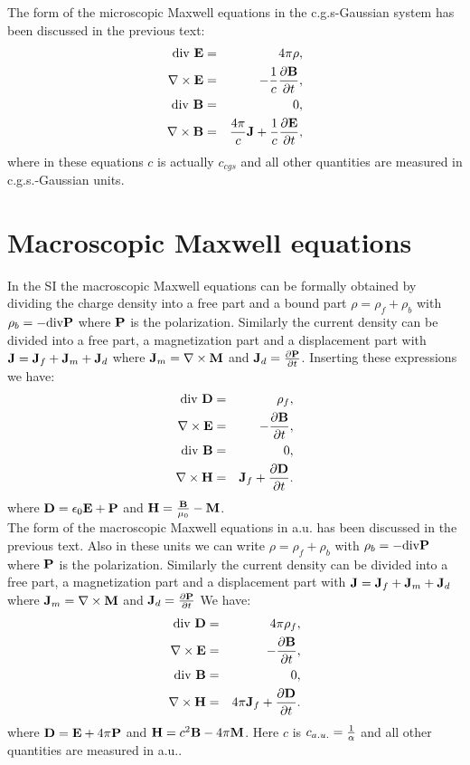 \documentclass[12pt,a4paper]{article}
\begin{document}
{\color{orange} The form of the microscopic Maxwell equations
in the c.g.s-Gaussian system has been discussed in the previous text:
\begin{eqnarray}
{\rm div}\ {\bf E} &=& 4 \pi \rho, \\
\nabla \times {\bf E} &=& -{1\over c} {\partial {\bf B} \over \partial t}, \\
{\rm div}\  {\bf B} &=& 0, \\
\nabla \times {\bf B} &=& {4 \pi \over c} {\bf J}+ {1\over c}
{\partial {\bf E} \over \partial t}, 
\end{eqnarray}
where in these equations $c$ is actually $c_{cgs}$ and all 
other quantities are measured in c.g.s.-Gaussian units.
}

\newpage
\section{\color{coral}Macroscopic Maxwell equations}
In the SI the macroscopic Maxwell equations can be formally
obtained by dividing the charge density into a free part and a
bound part $\rho=\rho_f+\rho_b$ with $\rho_b=-{\rm div} {\bf P}$
where ${\bf P}$ is the polarization.
Similarly the current density can be divided into a free part, a 
magnetization part 
and a displacement part with ${\bf J}={\bf J}_f + {\bf J}_m + {\bf J}_d$ where
${\bf J}_m=\nabla \times {\bf M}$ and ${\bf J}_d={\partial {\bf P}\over 
\partial t}$.
Inserting these expressions we have:
\begin{eqnarray}
{\rm div}\ {\bf D} &=& \rho_f, \\
\nabla \times {\bf E} &=& -{\partial {\bf B} \over \partial t}, \\
{\rm div}\  {\bf B} &=& 0, \\
\nabla \times {\bf H} &=& {\bf J}_f+ {\partial {\bf D} \over \partial t}. 
\end{eqnarray}
where ${\bf D}=\epsilon_0 {\bf E}+{\bf P}$ and ${\bf H}={{\bf B}\over \mu_0}-
{\bf M}$.
\\

{\color{web-blue} The form of the macroscopic Maxwell equations
in a.u. has been discussed in the previous text. Also in these
units we can write $\rho=\rho_f+\rho_b$ with $\rho_b=-{\rm div} {\bf P}$
where ${\bf P}$ is the polarization.
Similarly the current density can be divided into a free part, a magnetization
part
and a displacement part with ${\bf J}={\bf J}_f + {\bf J}_m + {\bf J}_d$ where
${\bf J}_m=\nabla \times {\bf M}$ and ${\bf J}_d={\partial {\bf P}\over 
\partial t}$
We have:
\begin{eqnarray}
{\rm div}\ {\bf D} &=& 4 \pi \rho_f, \\
\nabla \times {\bf E} &=& -{\partial {\bf B} \over \partial t}, \\
{\rm div}\  {\bf B} &=& 0, \\
\nabla \times {\bf H} &=& 4 \pi {\bf J}_f+ {\partial {\bf D} \over 
\partial t}. 
\end{eqnarray}
where ${\bf D}={\bf E} + 4 \pi {\bf P}$ and ${\bf H}={c^2
{\bf B}}- 4 \pi {\bf M}$.
Here $c$ is $c_{a.u.}={1\over \alpha}$ and all other quantities are 
measured in a.u..
}
\\
\end{document}
